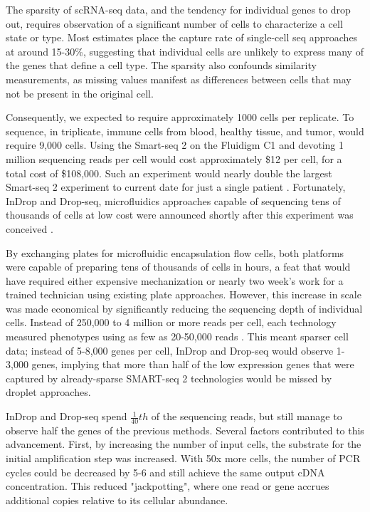 The sparsity of scRNA-seq data, and the tendency for individual genes to drop out, requires observation of a significant number of cells to characterize a cell state or type. 
Most estimates place the capture rate of single-cell seq approaches at around 15-30\%, suggesting that individual cells are unlikely to express many of the genes that define a cell type. 
The sparsity also confounds similarity measurements, as missing values manifest as differences between cells that may not be present in the original cell. 

Consequently, we expected to require approximately 1000 cells per replicate. 
To sequence, in triplicate, immune cells from blood, healthy tissue, and tumor, would require 9,000 cells. 
Using the Smart-seq 2 on the Fluidigm C1 and devoting 1 million sequencing reads per cell would cost approximately \$12 per cell, for a total cost of \$108,000.
Such an experiment would nearly double the largest Smart-seq 2 experiment to current date for just a single patient \citep{Zheng2017}. 
Fortunately, InDrop and Drop-seq, microfluidics approaches capable of sequencing tens of thousands of cells at low cost were announced shortly after this experiment was conceived \citep{Klein2015,Macosko2015}. 

By exchanging plates for microfluidic encapsulation flow cells, both platforms were capable of preparing tens of thousands of cells in hours, a feat that would have required either expensive mechanization or nearly two week’s work for a trained technician using existing plate approaches. 
However, this increase in scale was made economical by significantly reducing the sequencing depth of individual cells.
Instead of 250,000 to 4 million or more reads per cell, each technology measured phenotypes using as few as 20-50,000 reads \citep{Klein2015,Macosko2015}.
This meant sparser cell data; instead of 5-8,000 genes per cell, InDrop and Drop-seq would observe 1-3,000 genes, implying that more than half of the low expression genes that were captured by already-sparse SMART-seq 2 technologies would be missed by droplet approaches.  

InDrop and Drop-seq spend $\frac{1}{40}th$ of the sequencing reads, but still manage to observe half the genes of the previous methods. 
Several factors contributed to this advancement. 
First, by increasing the number of input cells, the substrate for the initial amplification step was increased. With 50x more cells, the number of PCR cycles could be decreased by 5-6 and still achieve the same output cDNA concentration.
This reduced "jackpotting", where one read or gene accrues additional copies relative to its cellular abundance. 

